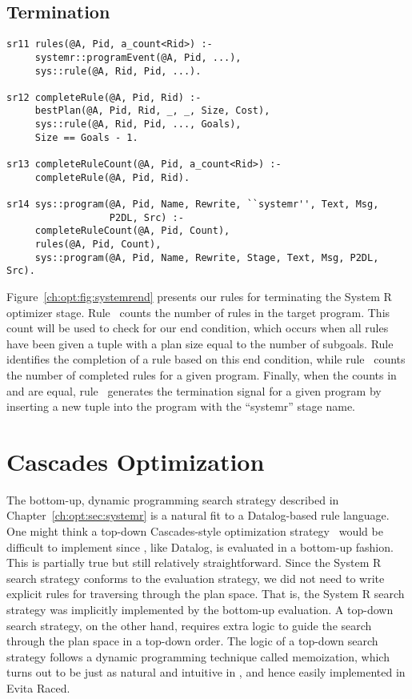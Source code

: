 \subsection{Termination}
\label{ch:opt:sec:termination}

\begin{figure*}
\ssp
\centering
\begin{lstlisting}
sr11 rules(@A, Pid, a_count<Rid>) :-
     systemr::programEvent(@A, Pid, ...),
     sys::rule(@A, Rid, Pid, ...).

sr12 completeRule(@A, Pid, Rid) :-
     bestPlan(@A, Pid, Rid, _, _, Size, Cost),
     sys::rule(@A, Rid, Pid, ..., Goals),
     Size == Goals - 1.

sr13 completeRuleCount(@A, Pid, a_count<Rid>) :-
     completeRule(@A, Pid, Rid).

sr14 sys::program(@A, Pid, Name, Rewrite, ``systemr'', Text, Msg, 
                  P2DL, Src) :-
     completeRuleCount(@A, Pid, Count),
     rules(@A, Pid, Count),
     sys::program(@A, Pid, Name, Rewrite, Stage, Text, Msg, P2DL, Src).
\end{lstlisting}
\caption{\label{ch:opt:fig:systemrend}System R termination rules.}
\end{figure*}

Figure~\ref{ch:opt:fig:systemrend} presents our rules for terminating the
System R optimizer stage.  Rule~ counts the number of rules in the target
program.  This count will be used to check for our end condition, which occurs
when all rules have been given a  tuple with a plan size equal to
the number of subgoals.  Rule~ identifies the completion of a rule based
on this end condition, while rule~ counts the number of completed rules
for a given program.  Finally, when the counts in  and
 are equal, rule~ generates the termination signal for a given
program by inserting a new tuple into the  program with the ``systemr''
stage name.

\section{Cascades Optimization}
\label{ch:opt:sec:cascades}

The bottom-up, dynamic programming search strategy described in
Chapter~\ref{ch:opt:sec:systemr} is a natural fit to a Datalog-based rule
language.  One might think a top-down Cascades-style optimization
strategy~\cite{cascades} would be difficult to implement since \OVERLOG, like
Datalog, is evaluated in a bottom-up fashion.  This is partially true but still
relatively straightforward.  Since the System R search strategy conforms to the
\OVERLOG evaluation strategy, we did not need to write explicit rules for
traversing through the plan space.  That is, the System R search strategy was
implicitly implemented by the \OVERLOG bottom-up evaluation.  A top-down search
strategy, on the other hand, requires extra logic to guide the search through
the plan space in a top-down order.  The logic of a top-down search strategy
follows a dynamic programming technique called memoization, which turns out to
be just as natural and intuitive in \OVERLOG, and hence easily implemented in
Evita Raced.

